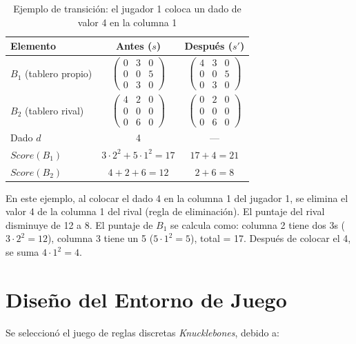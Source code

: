\begin{table}[H]
\centering
\caption{Ejemplo de transición: el jugador 1 coloca un dado de valor 4 en la columna 1}
\begin{tabular}{lcc}
\hline
\textbf{Elemento} & \textbf{Antes ($s$)} & \textbf{Después ($s'$)} \\
\hline
$B_1$ (tablero propio)   & $\begin{pmatrix} 0 & 3 & 0 \\ 0 & 0 & 5 \\ 0 & 3 & 0 \end{pmatrix}$ & $\begin{pmatrix} 4 & 3 & 0 \\ 0 & 0 & 5 \\ 0 & 3 & 0 \end{pmatrix}$ \\[12pt]
$B_2$ (tablero rival)    & $\begin{pmatrix} 4 & 2 & 0 \\ 0 & 0 & 0 \\ 0 & 6 & 0 \end{pmatrix}$ & $\begin{pmatrix} 0 & 2 & 0 \\ 0 & 0 & 0 \\ 0 & 6 & 0 \end{pmatrix}$ \\[12pt]
Dado $d$ & 4 & --- \\
$Score(B_1)$ & $3 \cdot 2^2 + 5 \cdot 1^2 = 17$ & $17 + 4 = 21$ \\
$Score(B_2)$ & $4 + 2 + 6 = 12$ & $2 + 6 = 8$ \\
\hline
\end{tabular}
\label{tab:ejemplo_transicion}
\end{table}

En este ejemplo, al colocar el dado 4 en la columna 1 del jugador 1, se elimina el valor 4 de la columna 1 del rival (regla de eliminación). El puntaje del rival disminuye de 12 a 8. El puntaje de $B_1$ se calcula como: columna 2 tiene dos 3s ($3 \cdot 2^2 = 12$), columna 3 tiene un 5 ($5 \cdot 1^2 = 5$), total = 17. Después de colocar el 4, se suma $4 \cdot 1^2 = 4$.

\section{Diseño del Entorno de Juego}

Se seleccionó el juego de reglas discretas \textit{Knucklebones}, debido a:

